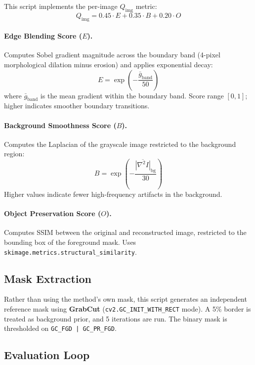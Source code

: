 \documentclass[11pt,a4paper]{article}
\begin{document}
This script implements the per-image $Q_{\text{img}}$ metric:
\begin{equation}
  Q_{\text{img}} = 0.45 \cdot E + 0.35 \cdot B + 0.20 \cdot O
\end{equation}

\paragraph{Edge Blending Score ($E$).}
Computes Sobel gradient magnitude across the boundary band (4-pixel morphological dilation minus erosion) and applies exponential decay:
\begin{equation}
  E = \exp\left(-\frac{\bar{g}_{\text{band}}}{50}\right)
\end{equation}
where $\bar{g}_{\text{band}}$ is the mean gradient within the boundary band. Score range $[0, 1]$; higher indicates smoother boundary transitions.

\paragraph{Background Smoothness Score ($B$).}
Computes the Laplacian of the grayscale image restricted to the background region:
\begin{equation}
  B = \exp\left(-\frac{\overline{|\nabla^2 I|}_{\text{bg}}}{30}\right)
\end{equation}
Higher values indicate fewer high-frequency artifacts in the background.

\paragraph{Object Preservation Score ($O$).}
Computes SSIM between the original and reconstructed image, restricted to the bounding box of the foreground mask. Uses \texttt{skimage.metrics.structural\_similarity}.

\subsection{Mask Extraction}

Rather than using the method's own mask, this script generates an independent reference mask using \textbf{GrabCut} (\texttt{cv2.GC\_INIT\_WITH\_RECT} mode). A 5\% border is treated as background prior, and 5 iterations are run. The binary mask is thresholded on \texttt{GC\_FGD | GC\_PR\_FGD}.

\subsection{Evaluation Loop}
\end{document}
